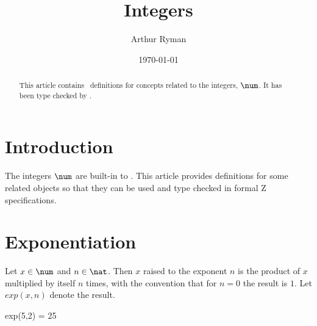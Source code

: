 \documentclass{amsart}
\begin{document}
\title{Integers}
\author{Arthur Ryman}
\date{\today}

\begin{abstract}
This article contains \ZN\ definitions for 
concepts related to the integers, $\num$.
It has been type checked by \fuzz.
\end{abstract}

\maketitle

\tableofcontents

\section{Introduction}

The integers $\num$ are built-in to \ZN.
This article provides definitions for some related objects so that they can be used and type checked in formal Z specifications.

\section{Exponentiation}

Let $x \in \num$ and $n \in \nat$. Then $x$ raised to the exponent $n$ is the product of $x$ multiplied by itself $n$ times,
with the convention that for $n = 0$ the result is $1$.
Let $exp(x, n)$ denote the result.


\begin{example}
\begin{zed}
	exp(5,2) = 25
\end{zed}
\end{example}

\begin{remark}
\end{remark}

\begin{remark}
\end{remark}
\end{document}

